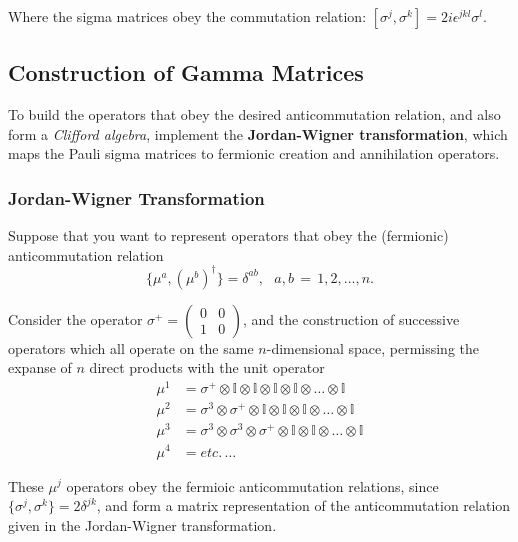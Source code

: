 \noindent Where the sigma matrices obey the commutation relation: $[\sigma^j,\sigma^k] = 2i\epsilon^{jkl} \sigma^l$. \\

\subsection*{Construction of Gamma Matrices}

\noindent To build the operators that obey the desired anticommutation relation, and also form a \textit{Clifford algebra}, implement the \textbf{Jordan-Wigner transformation}, which maps the Pauli sigma matrices to fermionic creation and annihilation operators.

\subsubsection*{Jordan-Wigner Transformation}

\noindent Suppose that you want to represent operators that obey the (fermionic) anticommutation relation
\begin{equation}
\{\mu^a, (\mu^b)^\dagger\} = \delta^{ab}, \,\,\,\, a,b \, = \, 1,2,\dots,n.
\end{equation}

\noindent Consider the operator $\sigma^+ = \left(\begin{array}{cc} 0 & 0 \\ 1 & 0 \end{array} \right)$, and the construction of successive operators which all operate on the same $n$-dimensional space, permissing the expanse of $n$ direct products with the unit operator
\begin{align*}
\mu^1 &= \sigma^+ \otimes \mathbb{I} \otimes \mathbb{I} \otimes \mathbb{I} \otimes \mathbb{I} \otimes \dots \otimes \mathbb{I} \\
\mu^2 &= \sigma^3 \otimes \sigma^+ \otimes \mathbb{I} \otimes \mathbb{I} \otimes \mathbb{I} \otimes \dots \otimes \mathbb{I} \\
\mu^3 &= \sigma^3 \otimes \sigma^3 \otimes \sigma^+ \otimes \mathbb{I} \otimes \mathbb{I} \otimes \dots \otimes \mathbb{I} \\
\mu^4 &= etc. \, \dots
\end{align*}

\noindent These $\mu^j$ operators obey the fermioic anticommutation relations, since $\{\sigma^j, \sigma^k \} = 2 \delta^{jk}$, and form a matrix representation of the anticommutation relation given in the Jordan-Wigner transformation.

